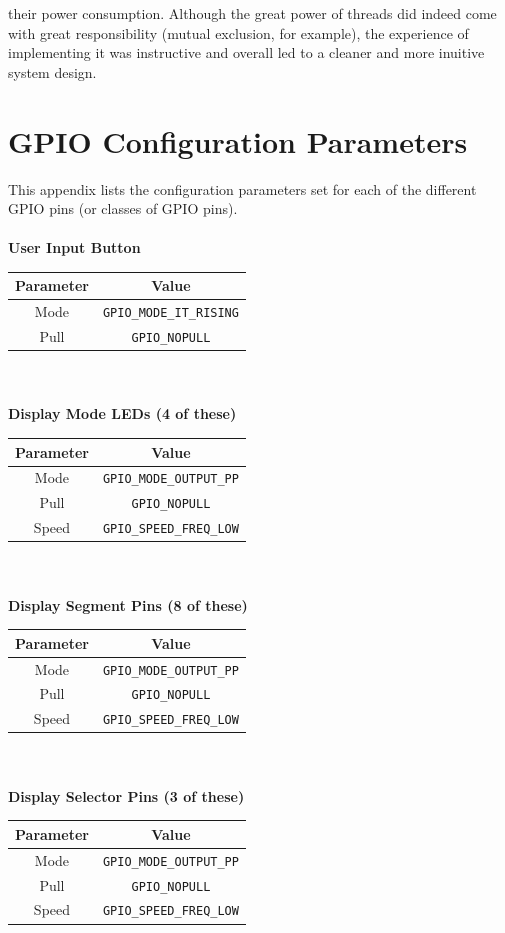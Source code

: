 \documentclass[12pt]{report}
\begin{document}
their power consumption. Although the great power of threads did indeed come with great
responsibility (mutual exclusion, for example), the experience of implementing it was instructive
and overall led to a cleaner and more inuitive system design.
\newpage
\begin{appendix}\label{appendices}
	\chapter{GPIO Configuration Parameters}\label{appendixgpio}
	This appendix lists the configuration parameters set for each of the different GPIO pins (or
	classes of GPIO pins).\\\\
	\textbf{User Input Button}\\
	\begin{tabular}{|c|c|}
		\hline
		Parameter & Value\\\hline
		Mode & \texttt{GPIO\_MODE\_IT\_RISING}\\\hline
		Pull & \texttt{GPIO\_NOPULL}\\\hline
	\end{tabular}
	\newline
	\\\\
	\textbf{Display Mode LEDs (4 of these)}\\
	\begin{tabular}{|c|c|}
		\hline
		Parameter & Value\\\hline
		Mode & \texttt{GPIO\_MODE\_OUTPUT\_PP}\\\hline
		Pull & \texttt{GPIO\_NOPULL}\\\hline
		Speed & \texttt{GPIO\_SPEED\_FREQ\_LOW}\\\hline
	\end{tabular}
	\newline
	\\\\
	\textbf{Display Segment Pins (8 of these)}\\
	\begin{tabular}{|c|c|}
		\hline
		Parameter & Value\\\hline
		Mode & \texttt{GPIO\_MODE\_OUTPUT\_PP}\\\hline
		Pull & \texttt{GPIO\_NOPULL}\\\hline
		Speed & \texttt{GPIO\_SPEED\_FREQ\_LOW}\\\hline
	\end{tabular}
	\newline
	\\\\
	\textbf{Display Selector Pins (3 of these)}\\
	\begin{tabular}{|c|c|}
		\hline
		Parameter & Value\\\hline
		Mode & \texttt{GPIO\_MODE\_OUTPUT\_PP}\\\hline
		Pull & \texttt{GPIO\_NOPULL}\\\hline
		Speed & \texttt{GPIO\_SPEED\_FREQ\_LOW}\\\hline
	\end{tabular}
	\newline
	\newpage

\end{appendix}
\end{document}
